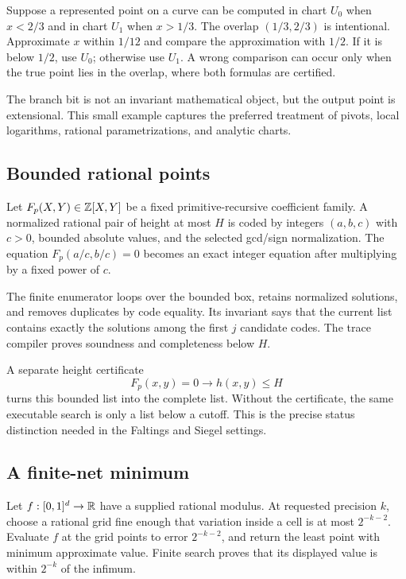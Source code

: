 Suppose a represented point on a curve can be computed in chart \(U_0\) when
\(x<2/3\) and in chart \(U_1\) when \(x>1/3\).  The overlap
\((1/3,2/3)\) is intentional.  Approximate \(x\) within \(1/12\) and compare
the approximation with \(1/2\).  If it is below \(1/2\), use \(U_0\);
otherwise use \(U_1\).  A wrong comparison can occur only when the true point
lies in the overlap, where both formulas are certified.

The branch bit is not an invariant mathematical object, but the output point
is extensional.  This small example captures the preferred treatment of
pivots, local logarithms, rational parametrizations, and analytic charts.

\subsection{Bounded rational points}

Let \(F_p(X,Y)\in\mathbb Z[X,Y]\) be a fixed primitive-recursive coefficient family.
A normalized rational pair of height at most \(H\) is coded by integers
\((a,b,c)\) with \(c>0\), bounded absolute values, and the selected gcd/sign
normalization.  The equation
\(F_p(a/c,b/c)=0\) becomes an exact integer equation after multiplying by a
fixed power of \(c\).

The finite enumerator loops over the bounded box, retains normalized solutions,
and removes duplicates by code equality.  Its invariant says that the current
list contains exactly the solutions among the first \(j\) candidate codes.
The trace compiler proves soundness and completeness below \(H\).

A separate height certificate
\[
 F_p(x,y)=0\to h(x,y)\le H
\]
turns this bounded list into the complete list.  Without the certificate, the
same executable search is only a list below a cutoff.  This is the precise
status distinction needed in the Faltings and Siegel settings.

\subsection{A finite-net minimum}

Let \(f:[0,1]^d\to\mathbb R\) have a supplied rational modulus.  At requested
precision \(k\), choose a rational grid fine enough that variation inside a
cell is at most \(2^{-k-2}\).  Evaluate \(f\) at the grid points to error
\(2^{-k-2}\), and return the least point with minimum approximate value.
Finite search proves that its displayed value is within \(2^{-k}\) of the
infimum.

